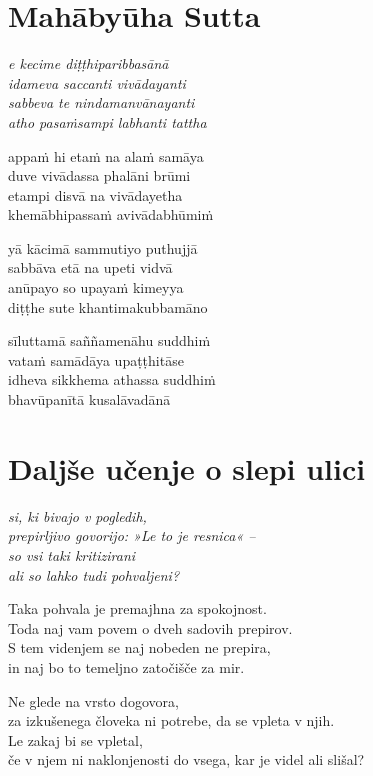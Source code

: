 

\cleartoverso
\chapter*{Mahābyūha Sutta}

\emph{e kecime diṭṭhiparibbasānā\\
idameva saccanti vivādayanti\\
sabbeva te nindamanvānayanti\\
atho pasaṁsampi labhanti tattha}

appaṁ hi etaṁ na alaṁ samāya\\
duve vivādassa phalāni brūmi\\
etampi disvā na vivādayetha\\
khemābhipassaṁ avivādabhūmiṁ

yā kācimā sammutiyo puthujjā\\
sabbāva etā na upeti vidvā\\
anūpayo so upayaṁ kimeyya\\
diṭṭhe sute khantimakubbamāno

sīluttamā saññamenāhu suddhiṁ\\
vataṁ samādāya upaṭṭhitāse\\
idheva sikkhema athassa suddhiṁ\\
bhavūpanītā kusalāvadānā


\cleartorecto
\chapter{Daljše učenje o slepi ulici}

\emph{si, ki bivajo v pogledih,\\
prepirljivo govorijo: »Le to je resnica« --\\
so vsi taki kritizirani\\
ali so lahko tudi pohvaljeni?}

Taka pohvala je premajhna za spokojnost.\\
Toda naj vam povem o dveh sadovih prepirov.\\
S tem videnjem se naj nobeden ne prepira,\\
in naj bo to temeljno zatočišče za mir.

Ne glede na vrsto dogovora,\\
za izkušenega človeka ni potrebe, da se vpleta v njih.\\
Le zakaj bi se vpletal,\\
če v njem ni naklonjenosti do vsega, kar je videl ali slišal?

